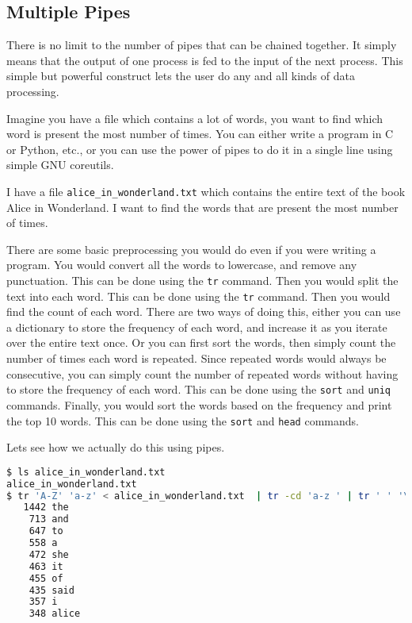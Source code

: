 \subsection{Multiple Pipes}

There is no limit to the number of pipes that can be chained together.
It simply means that the output of one process is fed to the input
of the next process. This simple but powerful construct lets the user
do any and all kinds of data processing.

Imagine you have a file which contains a lot of words, you want to
find which word is present the most number of times. You can either
write a program in C or Python, etc., or you can use the power of
pipes to do it in a single line using simple GNU coreutils.

I have a file \texttt{alice\_in\_wonderland.txt} which contains the
entire text of the book Alice in Wonderland. I want to find the words
that are present the most number of times.

There are some basic preprocessing you would do even if you were writing
a program. You would convert all the words to lowercase, and remove
any punctuation. This can be done using the \texttt{tr} command.
Then you would split the text into each word. This can be done using
the \texttt{tr} command. Then you would find the count of each word.
There are two ways of doing this, either you can use a dictionary
to store the frequency of each word, and increase it as you iterate
over the entire text once. Or you can first sort the words, then
simply count the number of times each word is repeated. Since repeated
words would always be consecutive, you can simply count the number
of repeated words without having to store the frequency of each word.
This can be done using the \texttt{sort} and \texttt{uniq} commands.
Finally, you would sort the words based on the frequency and print
the top 10 words. This can be done using the \texttt{sort} and \texttt{head}
commands.

Lets see how we actually do this using pipes.

\begin{lstlisting}[language=bash]
$ ls alice_in_wonderland.txt
alice_in_wonderland.txt
$ tr 'A-Z' 'a-z' < alice_in_wonderland.txt  | tr -cd 'a-z ' | tr ' ' '\n' | grep . | sort | uniq -c | sort -nr | head
   1442 the
    713 and
    647 to
    558 a
    472 she
    463 it
    455 of
    435 said
    357 i
    348 alice
\end{lstlisting}

